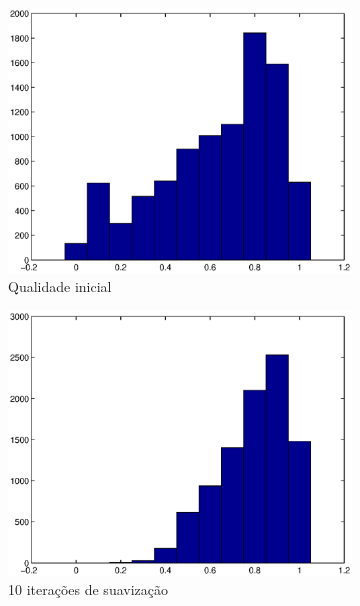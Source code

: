\documentclass[11pt]{article}
\begin{document}

		\begin{figure}
			\centering
			\begin{subfigure}[b]{0.45\textwidth}
				\centering
				\includegraphics[width=\textwidth]{figures/0iter_sphere}
				\caption{Qualidade inicial}				
			\end{subfigure}
			\begin{subfigure}[b]{0.45\textwidth}
				\centering
				\includegraphics[width=\textwidth]{figures/10iter_sphere}
				\caption{10 iterações de suavização}				
			\end{subfigure}
			\begin{subfigure}[b]{0.45\textwidth}

\end{subfigure}
\end{figure}
\end{document}
